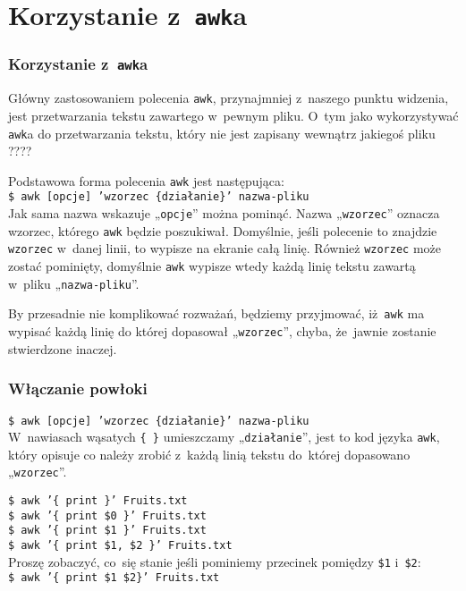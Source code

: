 \documentclass[10pt,t]{beamer}
\begin{document}
\section{Korzystanie z~\texttt{awk}a}


\begin{frame}
  \frametitle{Korzystanie z~\texttt{awk}a}


  Główny zastosowaniem polecenia \texttt{awk}, przynajmniej z~naszego
  punktu widzenia, jest przetwarzania tekstu zawartego
  w~pewnym pliku. O~tym jako wykorzystywać \texttt{awk}a do przetwarzania
  tekstu, który nie jest zapisany wewnątrz jakiegoś pliku ????

  Podstawowa forma polecenia \texttt{awk} jest następująca: \\
  \texttt{\$ awk [opcje] 'wzorzec \{działanie\}' nazwa-pliku} \\
  Jak sama nazwa wskazuje „\texttt{opcje}” można pominąć. Nazwa
  „\texttt{wzorzec}” oznacza wzorzec, którego \texttt{awk} będzie
  poszukiwał. Domyślnie, jeśli polecenie to znajdzie \texttt{wzorzec}
  w~danej linii, to wypisze na ekranie całą linię. Również \texttt{wzorzec}
  może zostać pominięty, domyślnie \texttt{awk} wypisze wtedy każdą linię
  tekstu zawartą w~pliku „\texttt{nazwa-pliku}”.

  By przesadnie nie komplikować rozważań, będziemy przyjmować,
  iż~\texttt{awk} ma wypisać każdą linię do której dopasował
  „\texttt{wzorzec}”, chyba, że~jawnie zostanie stwierdzone inaczej.

\end{frame}





\begin{frame}
  \frametitle{Włączanie powłoki}


  \texttt{\$ awk [opcje] 'wzorzec \{działanie\}' nazwa-pliku} \\
  W~nawiasach wąsatych \texttt{\{ \}} umieszczamy „\texttt{działanie}”, jest
  to kod języka \texttt{awk}, który opisuje co należy zrobić z~każdą linią
  tekstu do~której dopasowano „\texttt{wzorzec}”.

  \texttt{\$ awk '\{ print \}' Fruits.txt} \\
  \texttt{\$ awk '\{ print \$0 \}' Fruits.txt} \\
  \texttt{\$ awk '\{ print \$1 \}' Fruits.txt} \\

  \texttt{\$ awk '\{ print \$1, \$2 \}' Fruits.txt} \\
  Proszę zobaczyć, co~się stanie jeśli pominiemy przecinek pomiędzy
  \texttt{\$1} i~\texttt{\$2}: \\
  \texttt{\$ awk '\{ print \$1 \$2\}' Fruits.txt} \\

\end{frame}
\end{document}
